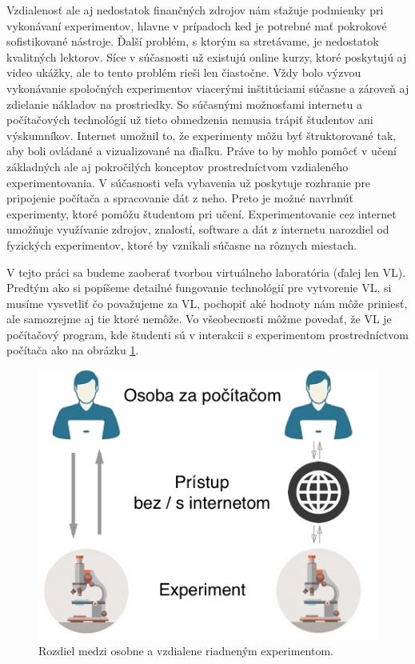 Vzdialenosť ale aj nedostatok finančných zdrojov nám sťažuje podmienky pri vykonávaní experimentov, hlavne v prípadoch ked je potrebné mať pokrokové sofistikované nástroje. Ďalší problém, s ktorým sa stretávame, je nedostatok kvalitných lektorov. Síce v súčasnosti už existujú online kurzy, ktoré poskytujú aj video ukážky, ale to tento problém rieši len čiastočne. Vždy bolo výzvou vykonávanie spoločných experimentov viacerými inštitúciami súčasne a zároveň aj zdielanie nákladov na prostriedky. So súčasnými možnosťami internetu a počítačových technológií už tieto obmedzenia nemusia trápiť študentov ani výskumníkov. Internet umožnil to, že experimenty môžu byť štruktorované tak, aby boli ovládané a vizualizované na ďiaľku. Práve to by mohlo pomôcť v učení základných ale aj pokročilých konceptov prostredníctvom vzdialeného experimentovania. V súčasnosti veľa vybavenia už poskytuje rozhranie pre pripojenie počítača a spracovanie dát z neho. Preto je možné navrhnúť experimenty, ktoré pomôžu študentom pri učení. Experimentovanie cez internet umožňuje využívanie zdrojov, znalostí, software a dát z internetu narozdiel od fyzických experimentov, ktoré by vznikali súčasne na rôznych miestach.\cite{vlabphylosopfy}

V tejto práci sa budeme zaoberať tvorbou virtuálneho laboratória (ďalej len VL). Predtým ako si popíšeme detailné fungovanie technológií pre vytvorenie VL, si musíme vysvetliť čo považujeme za VL, pochopiť aké hodnoty nám môže priniesť, ale samozrejme aj tie ktoré nemôže. Vo všeobecnosti môžme povedať, že VL je počítačový program, kde študenti sú v interakcii s experimentom prostredníctvom počítača ako na obrázku \ref{img-real-vs-remote}. 

\begin{figure}[H]
  \centering
  \includegraphics[scale=0.40]{img/VL_vs_real.png}
  \caption{Rozdiel medzi osobne a vzdialene riadneným experimentom.}
  \label{img-real-vs-remote}
\end{figure}

